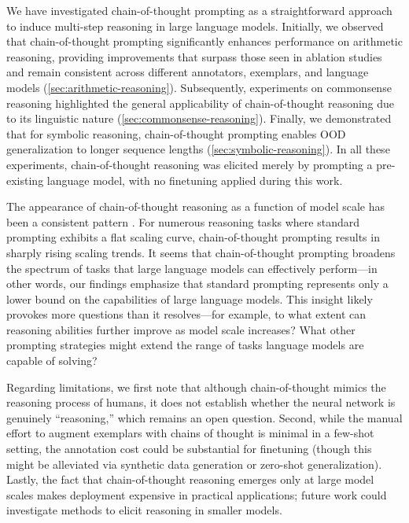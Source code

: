 We have investigated chain-of-thought prompting as a straightforward approach to induce multi-step reasoning in large language models. Initially, we observed that chain-of-thought prompting significantly enhances performance on arithmetic reasoning, providing improvements that surpass those seen in ablation studies and remain consistent across different annotators, exemplars, and language models (\cref{sec:arithmetic-reasoning}).
Subsequently, experiments on commonsense reasoning highlighted the general applicability of chain-of-thought reasoning due to its linguistic nature (\cref{sec:commonsense-reasoning}).
Finally, we demonstrated that for symbolic reasoning, chain-of-thought prompting enables OOD generalization to longer sequence lengths (\cref{sec:symbolic-reasoning}).
In all these experiments, chain-of-thought reasoning was elicited merely by prompting a pre-existing language model, with no finetuning applied during this work.

The appearance of chain-of-thought reasoning as a function of model scale has been a consistent pattern \citep{wei2022emergent}. For numerous reasoning tasks where standard prompting exhibits a flat scaling curve, chain-of-thought prompting results in sharply rising scaling trends. It seems that chain-of-thought prompting broadens the spectrum of tasks that large language models can effectively perform—in other words, our findings emphasize that standard prompting represents only a lower bound on the capabilities of large language models. This insight likely provokes more questions than it resolves—for example, to what extent can reasoning abilities further improve as model scale increases? What other prompting strategies might extend the range of tasks language models are capable of solving?

Regarding limitations, we first note that although chain-of-thought mimics the reasoning process of humans, it does not establish whether the neural network is genuinely “reasoning,” which remains an open question. Second, while the manual effort to augment exemplars with chains of thought is minimal in a few-shot setting, the annotation cost could be substantial for finetuning (though this might be alleviated via synthetic data generation or zero-shot generalization).
 Lastly, the fact that chain-of-thought reasoning emerges only at large model scales makes deployment expensive in practical applications; future work could investigate methods to elicit reasoning in smaller models.

